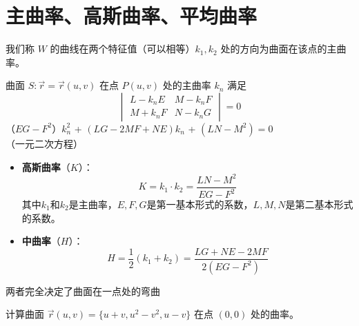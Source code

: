 \documentclass[lang=cn,10pt,thmcnt=section]{elegantbook}
\begin{document}
\section{主曲率、高斯曲率、平均曲率}
\begin{definition}[主曲率]
    我们称 $W$ 的曲线在两个特征值（可以相等）$k_1, k_2$ 处的方向为曲面在该点的主曲率。
\end{definition}
\begin{theorem}
	曲面 $S: \vec{r} = \vec{r}(u,v)$ 在点 $P(u,v)$ 处的主曲率 $k_n$ 满足
\[
\begin{vmatrix}
L - k_n E & M - k_n F \\
M + k_n F & N - k_n G
\end{vmatrix}
= 0
\]
（$EG - F^2$）$k_n^2$ + $(LG - 2MF + NE)k_n$ + $(LN - M^2) = 0$ （一元二次方程）
\end{theorem}
\begin{definition}[中曲率和高斯曲率]
    \begin{itemize}
        \item \textbf{高斯曲率}（$K$）：
        \[
        K = k_1 \cdot k_2 = \frac{LN - M^2}{EG - F^2}
        \]
        其中$k_1$和$k_2$是主曲率，$E,F,G$是第一基本形式的系数，$L,M,N$是第二基本形式的系数。
    
        \item \textbf{中曲率}（$H$）：
        \[
        H = \frac{1}{2}(k_1 + k_2) = \frac{LG + NE - 2MF}{2(EG - F^2)}
        \]
    \end{itemize}

    两者完全决定了曲面在一点处的弯曲
\end{definition}
\begin{example}
	计算曲面 $\vec{r}(u,v) = \{u+v, u^2-v^2, u-v\}$ 在点 $(0,0)$ 处的曲率。
\end{example}
\end{document}
